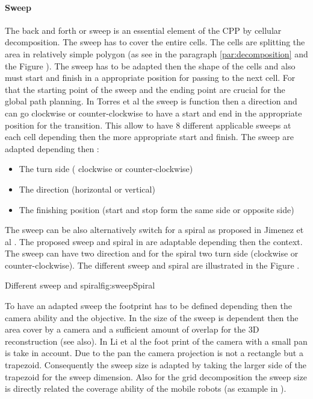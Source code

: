  \paragraph*{Sweep} \label{par:sweep}
	The back and forth or sweep is an essential element of the CPP by cellular decomposition. The sweep has to cover the entire cells. The cells are splitting the area in relatively simple polygon (as see in the paragraph \ref{par:decomposition} and  the Figure ). The sweep has to be adapted then the shape of the cells and also must start and finish in a appropriate position for passing to the next cell.
	For that the starting point of the sweep and the ending point are crucial for the global path planning.
	In Torres et al \cite{144*torres2016}  the sweep is function then a direction and can go clockwise or counter-clockwise to have a start and end in the appropriate position for the transition. 
	 This allow to have 8 different applicable sweeps at each cell depending then the more appropriate start and finish. The sweep are adapted depending then : 
	 \begin{itemize}
	 \item The turn side ( clockwise or counter-clockwise)
	 \item The direction (horizontal or vertical)
	 \item The finishing  position (start and stop form the same side or opposite side)
\end{itemize}	
	 The sweep can be also alternatively switch for a spiral as proposed in Jimenez et al \citep{217*jimenez2007}. The proposed sweep and spiral in  \citep{217*jimenez2007}  are adaptable depending then the context. The sweep can have two direction and for the spiral two turn side (clockwise or counter-clockwise).  The different sweep and spiral are illustrated in the Figure . 
	  \begin{mfigures}[!]{Different sweep and spiral}{fig:sweepSpiral} \centering
{}
\end{mfigures} 

	To have an adapted sweep the footprint has to be defined depending then the camera ability and the objective. In \cite{144*torres2016}  the size of the sweep is dependent then the area cover by a camera and a sufficient amount of overlap for the 3D reconstruction (see also\citep{191*di2016}). In Li et al  \citep{146*li2011} the foot print of the camera with a small pan is take in account. Due to the pan the camera projection is not a rectangle but a trapezoid. Consequently the sweep size is adapted by taking the larger side of the trapezoid for the sweep dimension.
	Also for the grid decomposition the sweep size is directly related the coverage ability of the mobile robots (as example in \citep{215*lee2010,195*choi2009}).  %
	
